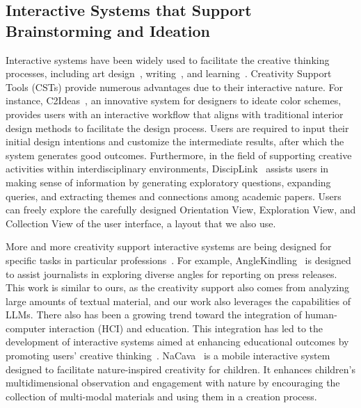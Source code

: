 \subsection{Interactive Systems that Support Brainstorming and Ideation}

Interactive systems have been widely used to facilitate the creative thinking processes, including art design~\cite{heyrani2021creativegan, frich2018hci}, writing~\cite{gero2022sparks}, and learning~\cite{jin2024codetree}. 
Creativity Support Tools (CSTs) provide numerous advantages due to their interactive nature. 
For instance, C2Ideas~\cite{hou2024c2ideas}, an innovative system for designers to ideate color schemes, provides users with an interactive workflow that aligns with traditional interior design methods to facilitate the design process. 
Users are required to input their initial design intentions and customize the intermediate results, after which the system generates good outcomes. Furthermore, in the field of supporting creative activities within interdisciplinary environments, DiscipLink~\cite{zheng2024disciplink} assists users in making sense of information by generating exploratory questions, expanding queries, and extracting themes and connections among academic papers. 
Users can freely explore the carefully designed Orientation View, Exploration View, and Collection View of the user interface, a layout that we also use.

More and more creativity support interactive systems are being designed for specific tasks in particular professions~\cite{louie2020novice, petridis2023anglekindling, choi2024creativeconnect, li2024diaryhelper}. 
For example, AngleKindling~\cite{petridis2023anglekindling} is designed to assist journalists in exploring diverse angles for reporting on press releases. 
This work is similar to ours, as the creativity support also comes from analyzing large amounts of textual material, and our work also leverages the capabilities of LLMs. 
There also has been a growing trend toward the integration of human-computer interaction (HCI) and education. 
This integration has led to the development of interactive systems aimed at enhancing educational outcomes by promoting users' creative thinking~\cite{zhang2022storydrawer}. NaCava~\cite{yan2023nacanva} is a mobile interactive system designed to facilitate nature-inspired creativity for children. 
It enhances children's multidimensional observation and engagement with nature by encouraging the collection of multi-modal materials and using them in a creation process.

